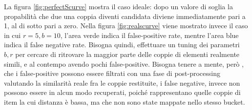 \documentclass[a4paper,12pt]{report}
\begin{document}
La figura \ref{fig:perfectScurve}  mostra il caso ideale: dopo un valore di soglia la propabilità che due una coppia diventi candidata diviene immediatamente pari a 1, al di sotto pari a zero. Nella figura \ref{fig:realscurve} viene mostrato invece il caso in cui $r=5,b=10$, l'area verde indica il false-positive rate, mentre l'area blue indica il false negative rate.
Bisogna quindi, effettuare un tuning dei parametri $b,r$ per cercare di ritrovare la maggior parte delle coppie di elementi realmente simili, e al contempo avendo pochi false-positive.
Bisogna tenere a mente, però , che i false-positive possono essere filtrati con una fase di post-processing valutando la similarità reale fra le coppie restituite, i false negative, invece non possono essere in alcun modo recuperati, poiché rappresentano quelle coppie di item la cui distanza è bassa, ma che non sono state mappate nello stesso bucket.

\end{document}
